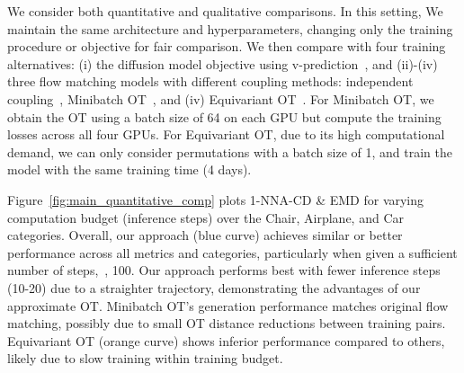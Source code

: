 We consider both quantitative and qualitative comparisons.
%
%
In this setting, We maintain the same architecture and hyperparameters, changing only the training procedure or objective for fair comparison.
%
We then compare with four training alternatives:
(i) the diffusion model objective using v-prediction~\cite{salimans2022progressive}, and (ii)-(iv) three flow matching models with different coupling methods: independent coupling~\cite{lipman2022flow}, Minibatch OT~\cite{tong2023improving,pooladian2023multisample}, and (iv) Equivariant OT~\cite{song2024equivariant,klein2024equivariant}.
%
For Minibatch OT, we obtain the OT using a batch size of 64 on each GPU but compute the training losses across all four GPUs.
%
For Equivariant OT, due to its high computational demand,
we can only consider permutations with 
a batch size of 1, and train the model with the same training time (4 days).

Figure~\ref{fig:main_quantitative_comp} plots 1-NNA-CD \& EMD for varying computation budget (inference steps) over the Chair, Airplane, and Car categories.
%
Overall, our approach (blue curve) achieves similar or better performance across all metrics and categories, particularly when given a sufficient number of steps,~\eg, 100.
%
%
Our approach performs best with fewer inference steps (10-20) due to a straighter trajectory, demonstrating the advantages of our approximate OT.
%
Minibatch OT's generation performance matches original flow matching, possibly due to small OT distance reductions between training pairs.
%
%
Equivariant OT (orange curve) shows 
inferior performance compared to others, likely due to slow training within training budget.


